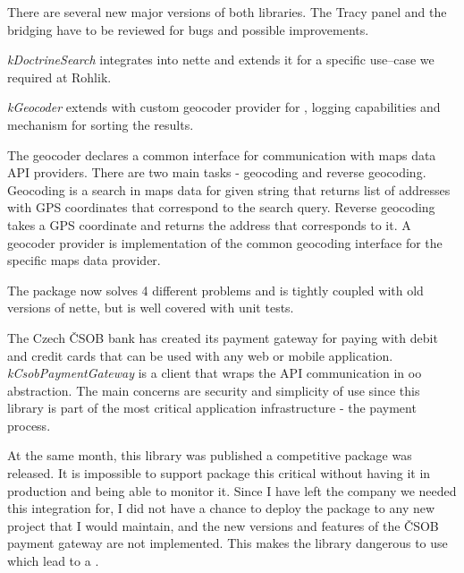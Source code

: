 There are several new major versions of both libraries. The Tracy panel and the bridging have to be reviewed for bugs and possible improvements.

 \label{sec:state:doctrine-search}

\textit{\gls{kDoctrineSearch}} integrates  into \gls{nette} and extends it for a specific use--case we required at Rohlik.

 \label{sec:state:geocoder}

\textit{\gls{kGeocoder}} extends  with custom geo\-co\-de\-r provider for , logging capabilities and mechanism for sorting the results.

The geo\-co\-de\-r declares a common interface for communication with maps data API providers. There are two main tasks - geocoding and reverse geocoding. Geocoding is a search in maps data for given string that returns list of addresses with GPS coordinates that correspond to the search query. Reverse geocoding takes a GPS coordinate and returns the address that corresponds to it. A geo\-co\-de\-r provider is implementation of the common geocoding interface for the specific maps data provider.

The package now solves 4 different problems and is tightly coupled with old versions of \gls{nette}, but is well covered with unit tests.

 \label{sec:state:csob-payment-gateway}

The Czech ČSOB bank has created its payment gateway for paying with debit and credit cards that can be used with any web or mobile application. \textit{\gls{kCsobPaymentGateway}} is a client that wraps the API communication in \gls{oo} abstraction. The main concerns are security and simplicity of use since this library is part of the most critical application infrastructure - the payment process.

At the same month, this library was published a competitive package  was released. It is impossible to support package this critical without having it in production and being able to monitor it. Since I have left the company we needed this integration for, I did not have a chance to deploy the package to any new project that I would maintain, and the new versions and features of the ČSOB payment gateway are not implemented. This makes the library dangerous to use which lead to a .

